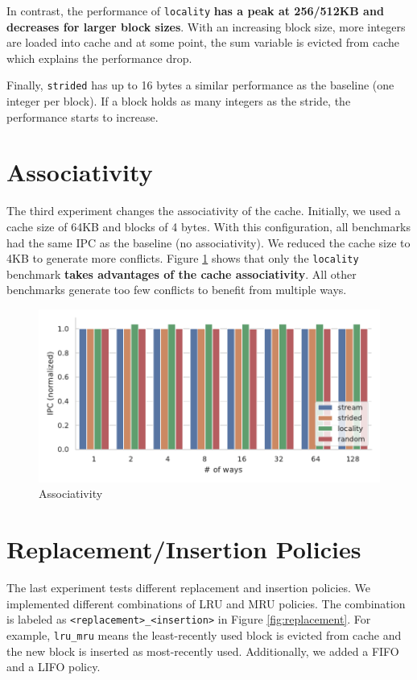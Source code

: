 \documentclass[a4paper]{article}
\begin{document}
In contrast, the performance of \texttt{locality} \textbf{has a peak at 256/512KB and
decreases for larger block sizes}. With an increasing block size, more integers
are loaded into cache and at some point, the sum variable is evicted from cache
which explains the performance drop.

Finally, \texttt{strided} has up to 16 bytes a similar performance as the
baseline (one integer per block). If a block holds as many integers as the
stride, the performance starts to increase.

\section{Associativity}

The third experiment changes the associativity of the cache. Initially, we used
a cache size of 64KB and blocks of 4 bytes. With this configuration, all
benchmarks had the same IPC as the baseline (no associativity). We reduced the
cache size to 4KB to generate more conflicts. Figure \ref{fig:ways} shows that
only the \texttt{locality} benchmark \textbf{takes advantages of the cache
associativity}. All other benchmarks generate too few conflicts to benefit from
multiple ways.
\begin{figure}
    \centering
    \includegraphics[width=\textwidth]{ways}
    \caption{Associativity}
    \label{fig:ways}
\end{figure}


\section{Replacement/Insertion Policies}

The last experiment tests different replacement and insertion policies. We
implemented different combinations of LRU and MRU policies. The combination is
labeled as \texttt{<replacement>\_<insertion>} in Figure \ref{fig:replacement}.
For example, \texttt{lru\_mru} means the least-recently used block is evicted
from cache and the new block is inserted as most-recently used. Additionally, we
added a FIFO and a LIFO policy.
\end{document}

